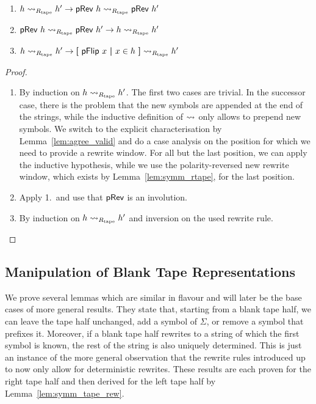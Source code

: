 \begin{lemma}\label{lem:symm_tape_rew}\leavevmode
  \begin{enumerate}
    \item $h \rightsquigarrow_{R_{\text{tape}}} h' \rightarrow \textsf{pRev}~h \rightsquigarrow_{R_{\text{tape}}} \textsf{pRev}~h'$ 
    \item $\textsf{pRev}~h \rightsquigarrow_{R_{\text{tape}}} \textsf{pRev}~h' \rightarrow h \rightsquigarrow_{R_{\text{tape}}} h'$
    \item $h \rightsquigarrow_{R_{\text{tape}}} h' \rightarrow \textbf{[}~ \textsf{pFlip}~x ~\textbf{|}~ x \in h ~\textbf{]} \rightsquigarrow_{R_{\text{tape}}} h'$
  \end{enumerate}
\end{lemma}
\begin{proof}
  \begin{enumerate}
    \item By induction on $h \rightsquigarrow_{R_{\text{tape}}} h'$. The first two cases are trivial. 
      In the successor case, there is the problem that the new symbols are appended at the end of the strings, while the inductive definition of $\rightsquigarrow_{}$ only allows to prepend new symbols. We switch to the explicit characterisation by Lemma~\ref{lem:agree_valid} and do a case analysis on the position for which we need to provide a rewrite window. For all but the last position, we can apply the inductive hypothesis, while we use the polarity-reversed new rewrite window, which exists by Lemma~\ref{lem:symm_rtape}, for the last position.
    \item Apply 1.\ and use that $\textsf{pRev}$ is an involution.
    \item By induction on $h \rightsquigarrow_{R_{\text{tape}}} h'$ and inversion on the used rewrite rule.
  \end{enumerate}
\end{proof}


\subsection{Manipulation of Blank Tape Representations}

We prove several lemmas which are similar in flavour and will later be the base cases of more general results. They state that, starting from a blank tape half, we can leave the tape half unchanged, add a symbol of $\Sigma$, or remove a symbol that prefixes it. Moreover, if a blank tape half rewrites to a string of which the first symbol is known, the rest of the string is also uniquely determined. This is just an instance of the more general observation that the rewrite rules introduced up to now only allow for deterministic rewrites.
These results are each proven for the right tape half and then derived for the left tape half by Lemma~\ref{lem:symm_tape_rew}. 


